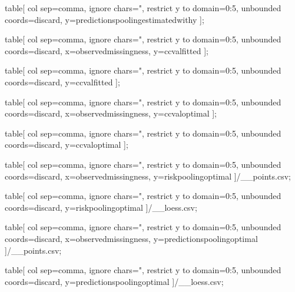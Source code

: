   table[
    col sep=comma,
    ignore chars={"},
    restrict y to domain=0:5,
    unbounded coords=discard,
    y=predictionspoolingestimatedwithy
  ]{\loessfile};

  table[
    col sep=comma,
    ignore chars={"},
    restrict y to domain=0:5,
    unbounded coords=discard,
    x=observedmissingness,
    y=ccvalfitted
  ]{\pointsfile};

  table[
    col sep=comma,
    ignore chars={"},
    restrict y to domain=0:5,
    unbounded coords=discard,
    y=ccvalfitted
  ]{\loessfile};

  table[
    col sep=comma,
    ignore chars={"},
    restrict y to domain=0:5,
    unbounded coords=discard,
    x=observedmissingness,
    y=ccvaloptimal
  ]{\pointsfile};

  table[
    col sep=comma,
    ignore chars={"},
    restrict y to domain=0:5,
    unbounded coords=discard,
    y=ccvaloptimal
  ]{\loessfile};

\else

  \edef\pointsfile{\tabledir/\scenario_\family_points.csv}
  \edef\loessfile{\tabledir/\scenario_\family_loess.csv}

  table[
    col sep=comma,
    ignore chars={"},
    restrict y to domain=0:5,
    unbounded coords=discard,
    x=observedmissingness,
    y=riskpoolingoptimal
  ]{\pointsfile};

  table[
    col sep=comma,
    ignore chars={"},
    restrict y to domain=0:5,
    unbounded coords=discard,
    y=riskpoolingoptimal
  ]{\loessfile};

  table[
    col sep=comma,
    ignore chars={"},
    restrict y to domain=0:5,
    unbounded coords=discard,
    x=observedmissingness,
    y=predictionspoolingoptimal
  ]{\pointsfile};

  table[
    col sep=comma,
    ignore chars={"},
    restrict y to domain=0:5,
    unbounded coords=discard,
    y=predictionspoolingoptimal
  ]{\loessfile};

